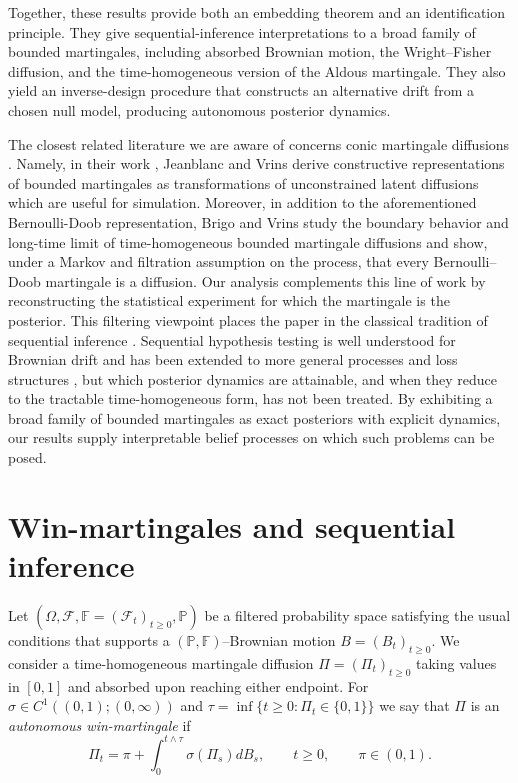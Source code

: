 \documentclass[11pt, reqno]{amsart}
\theoremstyle{plain}
\theoremstyle{remark}
\numberwithin{equation}{section}
\begin{document}
Together, these results provide both an embedding theorem and an identification principle. They give sequential-inference interpretations to a broad family of bounded martingales, including absorbed Brownian motion, the Wright--Fisher diffusion, and the time-homogeneous version of the Aldous martingale. They also yield an inverse-design procedure that constructs an alternative drift from a chosen null model, producing autonomous posterior dynamics.

The closest related literature we are aware of concerns conic martingale diffusions \cite{brigovrin2026,jeanblanc2018conic}. Namely, in their work \cite{jeanblanc2018conic}, Jeanblanc and Vrins derive constructive representations of bounded martingales
as transformations of unconstrained latent diffusions which are useful for simulation. Moreover, in addition to the aforementioned Bernoulli-Doob representation, Brigo and Vrins \cite{brigovrin2026} study the boundary behavior and long-time limit of time-homogeneous bounded martingale diffusions and show, under a Markov and filtration assumption on the process, that every Bernoulli--Doob martingale is a diffusion. Our analysis
complements this line of work by reconstructing the statistical experiment for which the martingale is the posterior. This filtering viewpoint places the paper in the classical
tradition of sequential inference
\cite{shiryaev1967two,wald1947}. Sequential hypothesis testing is well understood for Brownian drift \cite{gapeev2004wiener,shiryaev1967two} and has been extended to more general processes and loss structures \cite{campbell2025bayesian,gapeev2011sequential}, but which posterior dynamics are attainable, and when they reduce to the tractable time-homogeneous form, has not been treated. By exhibiting a broad family
of bounded martingales as exact posteriors with explicit dynamics, our results
supply interpretable belief processes on which such problems can be posed.
 
 
%


%
%

%

%

\section{Win-martingales and sequential inference}\label{sec:setup}

Let $(\Omega, \mathcal{F}, \mathbb{F}=(\mathcal{F}_t)_{t\geq0}, \mathbb{P})$ be a filtered probability space satisfying the usual conditions that supports a $(\mathbb{P},\mathbb{F})$--Brownian motion $B=(B_t)_{t\geq0}$. We consider a time-homogeneous martingale diffusion $\Pi=(\Pi_t)_{t\geq0}$ taking values in $[0,1]$ and absorbed upon reaching
either endpoint. For $\sigma\in C^1((0,1);(0,\infty))$  and $\tau=\inf\{t\ge0:\Pi_t\in\{0,1\}\}$ we say that $\Pi$ is an \emph{autonomous win-martingale}  if
%
%
\begin{equation}\label{eq:intro-target}
\Pi_t=\pi+\int_0^{t\wedge\tau}\sigma(\Pi_s)dB_s,
  \qquad t\geq0, \qquad \pi\in(0,1).
\end{equation}
%
%
\end{document}
